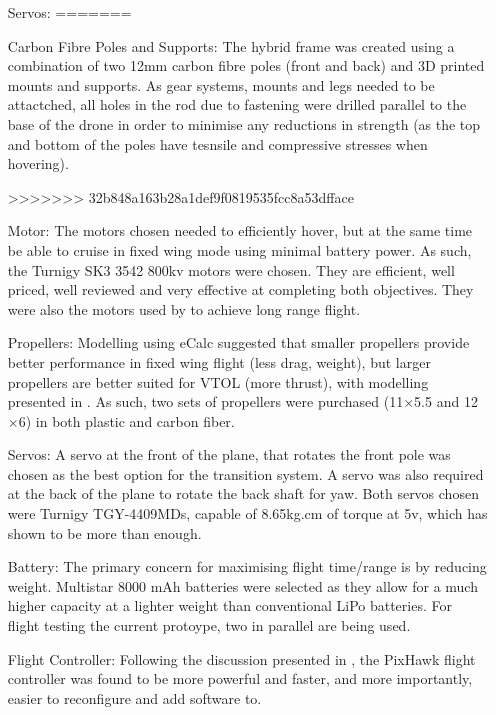 \begin{itemize}
		\item[Servos:]
=======
		\item[Carbon Fibre Poles and Supports:] The hybrid frame was created using a combination of two 12mm carbon fibre poles (front and back) and 3D printed mounts and supports. As gear systems, mounts and legs needed to be attactched, all holes in the rod due to fastening were drilled parallel to the base of the drone in order to minimise any reductions in strength (as the top and bottom of the poles have tesnsile and compressive stresses when hovering).
			
>>>>>>> 32b848a163b28a1def9f0819535fcc8a53dfface
	
		\item[Motor:] The motors chosen needed to efficiently hover, but at the same time be able to cruise in fixed wing mode using minimal battery power. As such, the Turnigy SK3 3542 800kv motors were chosen. They are efficient, well priced, well reviewed and very effective at completing both objectives. They were also the motors used by  to achieve long range flight.
	
		\item[Propellers:] Modelling using eCalc suggested that smaller propellers provide better performance in fixed wing flight (less drag, weight), but larger propellers are better suited for VTOL (more thrust), with modelling presented in . As such, two sets of propellers were purchased (11$\times$5.5 and 12$\times$6) in both plastic and carbon fiber.
	
		\item[Servos:] A servo at the front of the plane, that rotates the front pole was chosen as the best option for the transition system. A servo was also required at the back of the plane to rotate the back shaft for yaw. Both servos chosen were Turnigy TGY-4409MDs, capable of 8.65kg.cm of torque at 5v, which has shown to be more than enough. 
		
		\item[Battery:] The primary concern for maximising flight time/range is by reducing weight. Multistar 8000 mAh batteries were selected as they allow for a much higher capacity at a lighter weight than conventional LiPo batteries. For flight testing the current protoype, two in parallel are being used. 
	
		\item[Flight Controller:] Following the discussion presented in \cite{ref:controller_comparison}, the PixHawk flight controller was found to be more powerful and faster, and more importantly, easier to reconfigure and add software to.
		
	\end{itemize}
